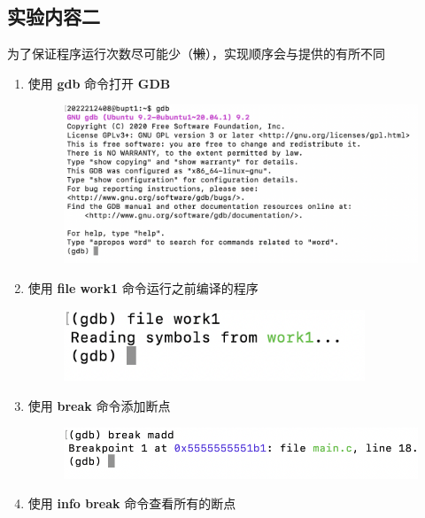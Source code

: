 \documentclass[UTF8, 12pt, a4paper, oneside]{ctexart}
\begin{document}
        \subsection{实验内容二}
            \par 为了保证程序运行次数尽可能少（\sout{懒}），实现顺序会与提供的有所不同
            \begin{enumerate}
                \item 使用 \textbf{gdb} 命令打开 \textbf{GDB}
                    \begin{figure}[htbp]
                        \includegraphics*[width = 15cm]{2.1.png}                        
                    \end{figure}
                \item 使用 \textbf{file work1} 命令运行之前编译的程序
                    \begin{figure}[htbp]
                        \includegraphics*[width = 9cm]{2.2.png}                        
                    \end{figure}
                \item 使用 \textbf{break} 命令添加断点
                    \begin{figure}[htbp]
                        \includegraphics*[width = 15cm]{2.3.png}                        
                    \end{figure}
                \newpage
                \item 使用 \textbf{info break} 命令查看所有的断点

\end{enumerate}
\end{document}
